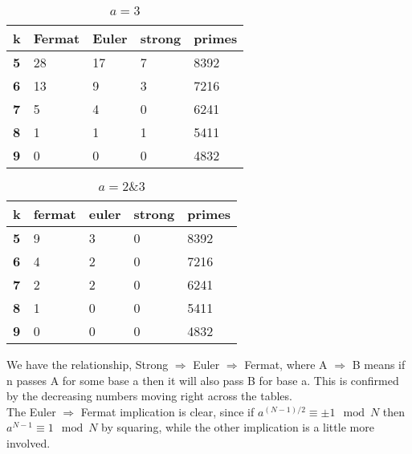\documentclass[10pt,a4paper]{report}
\begin{document}
\begin{table}[h]
\centering
\begin{tabular}{|l|l|l|l|l|}
\hline
\textbf{k} & \textbf{Fermat} & \textbf{Euler} & \textbf{strong} & \textbf{primes} \\ \hline
\textbf{5} & 28              & 17             & 7               & 8392            \\ \hline
\textbf{6} & 13              & 9              & 3               & 7216            \\ \hline
\textbf{7} & 5               & 4              & 0               & 6241            \\ \hline
\textbf{8} & 1               & 1              & 1               & 5411            \\ \hline
\textbf{9} & 0               & 0              & 0               & 4832            \\ \hline
\end{tabular}
\caption{$a=3$}
\end{table}

\begin{table}[h]
\centering
\begin{tabular}{|l|l|l|l|l|}
\hline
\textbf{k} & \textbf{fermat} & \textbf{euler} & \textbf{strong} & \textbf{primes} \\ \hline
\textbf{5} & 9               & 3              & 0               & 8392            \\ \hline
\textbf{6} & 4               & 2              & 0               & 7216            \\ \hline
\textbf{7} & 2               & 2              & 0               & 6241            \\ \hline
\textbf{8} & 1               & 0              & 0               & 5411            \\ \hline
\textbf{9} & 0               & 0              & 0               & 4832            \\ \hline
\end{tabular}
\caption{$a=2 \& 3$}
\end{table}

We have the relationship, Strong $\Rightarrow$ Euler $\Rightarrow$ Fermat, where A $\Rightarrow$ B means if n passes A for some base a then it will also pass B for base a. This is confirmed by the decreasing numbers moving right across the tables.\\

The Euler $\Rightarrow$ Fermat implication is clear, since if $a^{(N-1)/2} \equiv \pm 1 \mod N$ then $a^{N-1} \equiv 1 \mod N$ by squaring, while the other implication is a little more involved.
\end{document}
